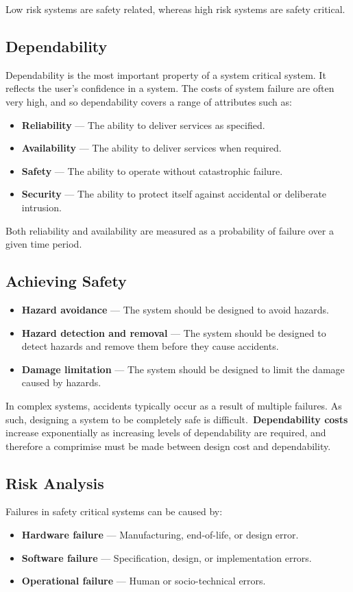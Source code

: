\documentclass{article}
\begin{document}
Low risk systems are safety related, whereas high risk systems are
safety critical.
\subsection{Dependability}
Dependability is the most important property of a system critical
system. It reflects the user's confidence in a system. The costs of
system failure are often very high, and so dependability covers a range
of attributes such as:
\begin{itemize}
    \item \textbf{Reliability} --- The ability to deliver services as
          specified.
    \item \textbf{Availability} --- The ability to deliver services
          when required.
    \item \textbf{Safety} --- The ability to operate without
          catastrophic failure.
    \item \textbf{Security} --- The ability to protect itself against
          accidental or deliberate intrusion.
\end{itemize}
Both reliability and availability are measured as a probability of
failure over a given time period.
\subsection{Achieving Safety}
\begin{itemize}
    \item \textbf{Hazard avoidance} --- The system should be designed
          to avoid hazards.
    \item \textbf{Hazard detection and removal} --- The system
          should be designed to detect hazards and remove them
          before they cause accidents.
    \item \textbf{Damage limitation} --- The system should be designed
          to limit the damage caused by hazards.
\end{itemize}
In complex systems, accidents typically occur as a result of multiple
failures. As such, designing a system to be completely safe is
difficult.\ \textbf{Dependability costs} increase exponentially as
increasing levels of dependability are required, and therefore a
comprimise must be made between design cost and dependability.
\subsection{Risk Analysis}
Failures in safety critical systems can be caused by:
\begin{itemize}
    \item \textbf{Hardware failure} --- Manufacturing, end-of-life,
          or design error.
    \item \textbf{Software failure} --- Specification, design,
          or implementation errors.
    \item \textbf{Operational failure} --- Human or socio-technical
          errors.
\end{itemize}
\end{document}
